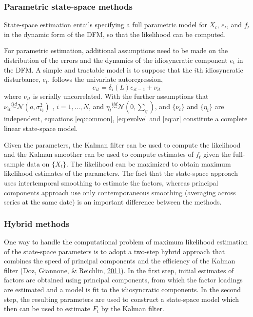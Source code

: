 \documentclass[12pt,twoside]{reedthesis}
\begin{document}
\hypertarget{parametric-state-space-methods}{%
\subsubsection{Parametric state-space methods}\label{parametric-state-space-methods}}

State-space estimation entails specifying a full parametric model for \(X_{t}\), \(e_{t}\), and \(f_{t}\) in the dynamic form of the DFM, so that the likelihood can be computed.

For parametric estimation, additional assumptions need to be made on the distribution of the errors and the dynamics of the idiosyncratic component \(e_{t}\) in the DFM. A simple and tractable model is to suppose that the \(i\)th idiosyncratic disturbance, \(e_{t}\), follows the univariate autoregression,
\begin{equation}
  e_{it} = \delta_{i} (L) e_{it - 1} + \nu_{it} \label{eq:ar}
\end{equation}
where \(\nu_{it}\) is serially uncorrelated. With the further assumptions that \(\nu_{it} \stackrel{iid}{\sim} \mathcal{N}(o, \sigma_{\nu_{i}}^{2})\) , \(i = 1, \ldots, N\), and \(\eta_{t} \stackrel{iid}{\sim} \mathcal{N}(0, \sum_{\eta})\), and \(\{\nu_{t}\}\) and \(\{\eta_{t}\}\) are independent, equations \eqref{eq:common}, \eqref{eq:evolve} and \eqref{eq:ar} constitute a complete linear state-space model.

Given the parameters, the Kalman filter can be used to compute the likelihood and the Kalman smoother can be used to compute estimates of \(f_{t}\) given the full-sample data on \(\{X_{t}\}\). The likelihood can be maximized to obtain maximum likelihood estimates of the parameters. The fact that the state-space approach uses intertemporal smoothing to estimate the factors, whereas principal components approach use only contemporaneous smoothing (averaging across series at the same date) is an important difference between the methods.

\hypertarget{hybrid-methods}{%
\subsubsection{Hybrid methods}\label{hybrid-methods}}

One way to handle the computational problem of maximum likelihood estimation of the state-space parameters is to adopt a two-step hybrid approach that combines the speed of principal components and the efficiency of the Kalman filter (Doz, Giannone, \& Reichlin, \protect\hyperlink{ref-dozgianreic:2011}{2011}). In the first step, initial estimates of factors are obtained using principal components, from which the factor loadings are estimated and a model is fit to the idiosyncratic components. In the second step, the resulting parameters are used to construct a state-space model which then can be used to estimate \(F_{t}\) by the Kalman filter.
\end{document}
